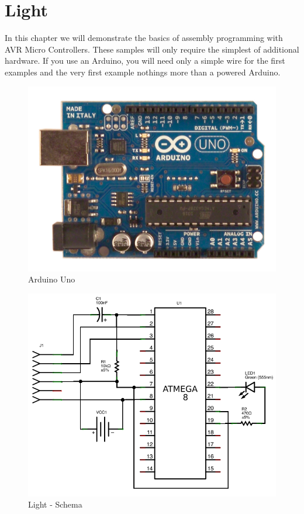 \documentclass[twoside,english,12pt,authoryear,openright]{book}
\begin{document}
\chapter{Light}

In this chapter we will demonstrate the basics of assembly programming with AVR Micro Controllers. These samples will only require the simplest of additional hardware. If you use an Arduino, you will need only a simple wire for the first examples and the very first example nothings more than a powered Arduino.

\begin{figure}[htbp]
  \centering
  \includegraphics[width=120mm]{Media/www-arduino-cc_ArduinoUnoFront.jpeg}
  \caption{Arduino Uno}
  \label{ArduinoUnoFront}
\end{figure}



\begin{figure}[htbp]
  \centering
  \includegraphics[width=120mm]{LED/S000_let-there-be-light_Circuit_schema.png}
  \caption{Light - Schema}
  \label{atmega8-let-there-be-light-schema}
\end{figure}
\end{document}
